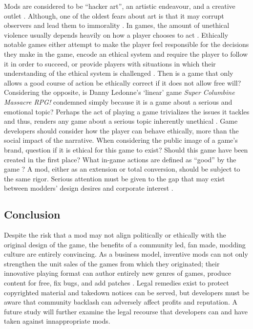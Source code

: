 \documentclass{scrartcl}
\begin{document}
Mods are considered to be ``hacker art'', an artistic endeavour, and a creative outlet \cite{sotamaa2010game}. Although, one of the oldest fears about art is that it may corrupt observers and lead them to immorality \cite{schulzke2009moral}. In games, the amount of unethical violence usually depends heavily on how a player chooses to act \cite{schulzke2010defending}. Ethically notable games either attempt to make the player feel responsible for the decisions they make in the game, encode an ethical system and require the player to follow it in order to succeed, or provide players with situations in which their understanding of the ethical system is challenged \cite{zagal2009ethically}. Then is a game that only allows a good course of action be ethically correct if it does not allow free will? Considering the opposite, is Danny Ledonne's `linear' game \textit{Super Columbine Massacre RPG!} condemned simply because it is a game about a serious and emotional topic? Perhaps the act of playing a game trivializes the issues it tackles and thus, renders any game about a serious topic inherently unethical \cite{zagal2009ethically}. Game developers should consider how the player can behave ethically, more than the social impact of the narrative. When considering the public image of a game's brand, question if it is ethical for this game to exist? Should this game have been created in the first place? What in-game actions are defined as ``good'' by the game \cite{zagal2009ethically}? A mod, either as an extension or total conversion, should be subject to the same rigor. Serious attention must be given to the gap that may exist between modders' design desires and corporate interest \cite{taylor2002whose}.

\subsection*{Conclusion}

Despite the risk that a mod may not align politically or ethically with the original design of the game, the benefits of a community led, fan made, modding culture are entirely convincing. As a business model, inventive mods can not only strengthen the unit sales of the games from which they originated; their innovative playing format can author entirely new genres of games, produce content for free, fix bugs, and add patches \cite{hong2014becoming}.  Legal remedies exist to protect copyrighted material \cite{copyright1988} \cite{trademarks1994} and takedown notices can be served, but developers must be aware that community backlash can adversely affect profits and reputation. A future study will further examine the legal recourse that developers can and have taken against innappropriate mods.



\end{document}
